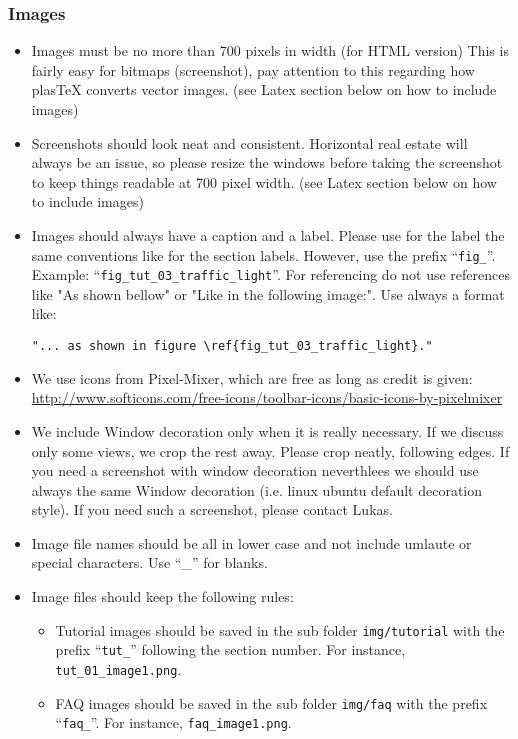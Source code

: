 \subsubsection{Images}
\begin{itemize}
	\item Images must be no more than 700 pixels in width (for HTML version)  This is fairly easy for bitmaps (screenshot), pay attention to this regarding how plasTeX converts vector images. (see Latex section below on how to include images)

    \item Screenshots should look neat and consistent.  Horizontal real estate will always be an issue, so please resize the windows before taking the screenshot to keep things readable at 700 pixel width.  (see Latex section below on how to include images)

	\item Images should always have a caption and a label. Please use for the label the same conventions like for the section labels. However, use the prefix ``\texttt{fig\_}''. Example: ``\texttt{fig\_tut\_03\_traffic\_light}''. For referencing do not use references like "As shown bellow" or "Like in the following image:". Use always a format like:

\begin{verbatim}"... as shown in figure \ref{fig_tut_03_traffic_light}."\end{verbatim}

	\item We use icons from Pixel-Mixer, which are free as long as credit is given: \url{http://www.softicons.com/free-icons/toolbar-icons/basic-icons-by-pixelmixer}

  \item We include Window decoration only when it is really necessary.  If we discuss only some views, we crop the rest away.  Please crop neatly, following edges. If you need a screenshot with window decoration neverthlees we should use always the same Window decoration (i.e. linux ubuntu default decoration style). If you need such a screenshot, please contact Lukas.

  \item Image file names should be all in lower case and not include umlaute or special characters. Use ``\_'' for blanks.

  \item Image files should keep the following rules:
	
\begin{itemize}
		\item Tutorial images should be saved in the sub folder \texttt{img/tutorial} with the prefix ``\texttt{tut\_}'' following the section number. For instance, \texttt{tut\_01\_image1.png}.

		\item FAQ images should be saved in the sub folder \texttt{img/faq} with the prefix ``\texttt{faq\_}''. For instance, \texttt{faq\_image1.png}.

	\end{itemize} 
	\end{itemize} 

